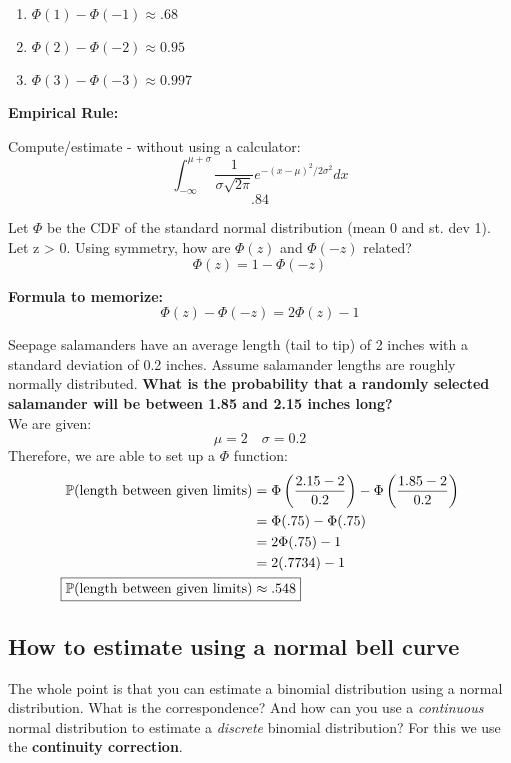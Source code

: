 \documentclass[titlepage, 12pt, leqno]{article}
\begin{document}
\begin{enumerate}
    \item $\Phi(1) - \Phi(-1) \approx .68$ 
    \item $\Phi(2) - \Phi(-2) \approx 0.95$ 
    \item $\Phi(3) - \Phi(-3) \approx 0.997$ 
\end{enumerate}

\textbf{Empirical Rule:} 

\begin{ex}
    Compute/estimate - without using a calculator:
    \[
        \int_{-\infty}^{\mu+\sigma}\frac{1}{\sigma\sqrt{2\pi}}e^{-(x-\mu)^2/2\sigma^2}dx 
    \]
    \[
    \boxed{.84} 
    \]
\end{ex}

\begin{ex}
    Let $\Phi$ be the CDF of the standard normal distribution (mean 0 and st. dev 1). Let z > 0. Using symmetry, how are $\Phi(z)$ and $\Phi(-z)$ related?
    \[
    \boxed{\Phi(z) = 1 - \Phi(-z)}
    \]
\end{ex}

\textbf{Formula to memorize:} 
\[
    \boxed{\Phi(z) - \Phi(-z) = 2\Phi(z) - 1}
\]

\begin{ex}
    Seepage salamanders have an average length (tail to tip) of 2 inches with a standard deviation of 0.2 inches. Assume salamander lengths are roughly normally distributed. \textbf{What is the probability that a randomly selected salamander will be between 1.85 and 2.15 inches long?} \\[.1in]
    We are given:
    \[
    \mu = 2 \quad \sigma = 0.2
    \]
    Therefore, we are able to set up a $\Phi$ function:
   \begin{align*}
       \mathbb{P}(\text{length between given limits}) &= \Phi\left(\frac{2.15-2}{0.2} \right) - \Phi\left(\frac{1.85-2}{0.2} \right) \\
                                                      &= \Phi(.75) - \Phi(.75) \\
                                                      &= 2\Phi(.75) - 1 \\
                                                      &= 2(.7734)-1 \\
       \Aboxed{\mathbb{P}(\text{length between given limits}) &\approx .548} 
   \end{align*}
\end{ex}

\subsection{How to estimate using a normal bell curve}
The whole point is that you can estimate a binomial distribution using a normal distribution. What is the correspondence? And how can you use a \textit{continuous} normal distribution to estimate a \textit{discrete} binomial distribution? For this we use the \textbf{continuity correction}. 
\end{document}
